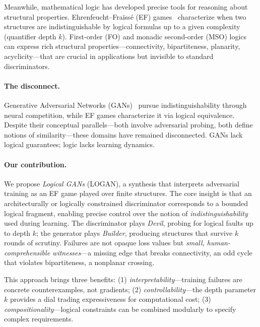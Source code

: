 \documentclass{article}
\begin{document}
Meanwhile, mathematical logic has developed precise tools for reasoning about structural properties. Ehrenfeucht--Fra\"iss\'e (EF) games~\cite{efgames,fraisse1954} characterize when two structures are indistinguishable by logical formulas up to a given complexity (quantifier depth $k$). First-order (FO) and monadic second-order (MSO) logics can express rich structural properties---connectivity, bipartiteness, planarity, acyclicity---that are crucial in applications but invisible to standard discriminators.

\paragraph{The disconnect.}
Generative Adversarial Networks (GANs)~\cite{goodfellow2014generative} pursue indistinguishability through neural competition, while EF games characterize it via logical equivalence. Despite their conceptual parallels---both involve adversarial probing, both define notions of similarity---these domains have remained disconnected. GANs lack logical guarantees; logic lacks learning dynamics.

\paragraph{Our contribution.}
We propose \emph{Logical GANs} (LOGAN), a synthesis that interprets adversarial training as an EF game played over finite structures. The core insight is that an architecturally or logically constrained discriminator corresponds to a bounded logical fragment, enabling precise control over the notion of \emph{indistinguishability} used during learning. The discriminator plays \emph{Devil}, probing for logical faults up to depth $k$; the generator plays \emph{Builder}, producing structures that survive $k$ rounds of scrutiny. Failures are not opaque loss values but \emph{small, human-comprehensible witnesses}---a missing edge that breaks connectivity, an odd cycle that violates bipartiteness, a nonplanar crossing.

This approach brings three benefits: (1) \emph{interpretability}---training failures are concrete counterexamples, not gradients; (2) \emph{controllability}---the depth parameter $k$ provides a dial trading expressiveness for computational cost; (3) \emph{compositionality}---logical constraints can be combined modularly to specify complex requirements.
\end{document}
